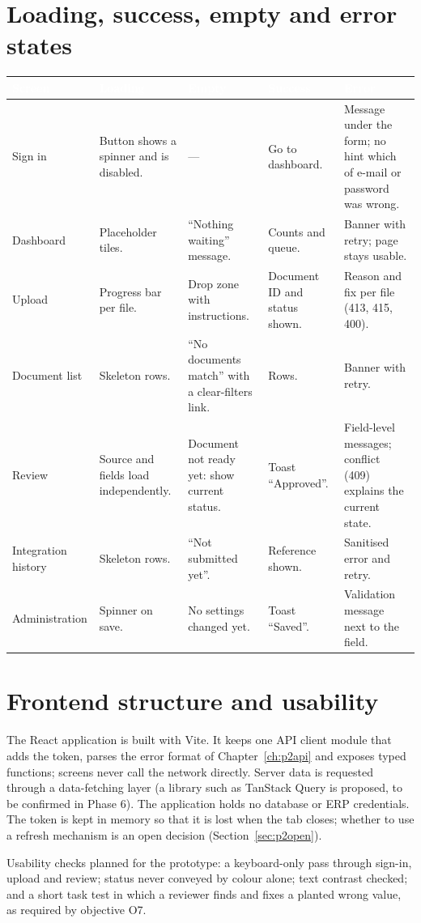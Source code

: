 \documentclass[11pt,a4paper]{report}
\newcommand{\hdr}[1]{\textcolor{white}{\sffamily\bfseries #1}}
\newcommand{\tblstart}{\rowcolors{2}{white}{rowgray}\arrayrulecolor{teal!60}}
\newcommand{\hdrrow}{\rowcolor{navy}}
\begin{document}
\section{Loading, success, empty and error states}
{\tblstart\footnotesize
\begin{longtable}{L{2.6cm}L{2.8cm}L{2.8cm}L{2.8cm}L{3.0cm}}
\hdrrow \hdr{Screen} & \hdr{Loading} & \hdr{Empty} & \hdr{Success} & \hdr{Error}\\ \endhead
Sign in & Button shows a spinner and is disabled. & --- & Go to dashboard. & Message under the form; no hint which of e-mail or password was wrong.\\
Dashboard & Placeholder tiles. & ``Nothing waiting'' message. & Counts and queue. & Banner with retry; page stays usable.\\
Upload & Progress bar per file. & Drop zone with instructions. & Document ID and status shown. & Reason and fix per file (413, 415, 400).\\
Document list & Skeleton rows. & ``No documents match'' with a clear-filters link. & Rows. & Banner with retry.\\
Review & Source and fields load independently. & Document not ready yet: show current status. & Toast ``Approved''. & Field-level messages; conflict (409) explains the current state.\\
Integration history & Skeleton rows. & ``Not submitted yet''. & Reference shown. & Sanitised error and retry.\\
Administration & Spinner on save. & No settings changed yet. & Toast ``Saved''. & Validation message next to the field.\\
\hline
\end{longtable}}

\section{Frontend structure and usability}
The React application is built with Vite. It keeps one API client module that adds the token, parses the error format of Chapter~\ref{ch:p2api} and exposes typed functions; screens never call the network directly. Server data is requested through a data-fetching layer (a library such as TanStack Query is proposed, to be confirmed in Phase 6). The application holds no database or ERP credentials. The token is kept in memory so that it is lost when the tab closes; whether to use a refresh mechanism is an open decision (Section~\ref{sec:p2open}).

Usability checks planned for the prototype: a keyboard-only pass through sign-in, upload and review; status never conveyed by colour alone; text contrast checked; and a short task test in which a reviewer finds and fixes a planted wrong value, as required by objective O7.
\end{document}
